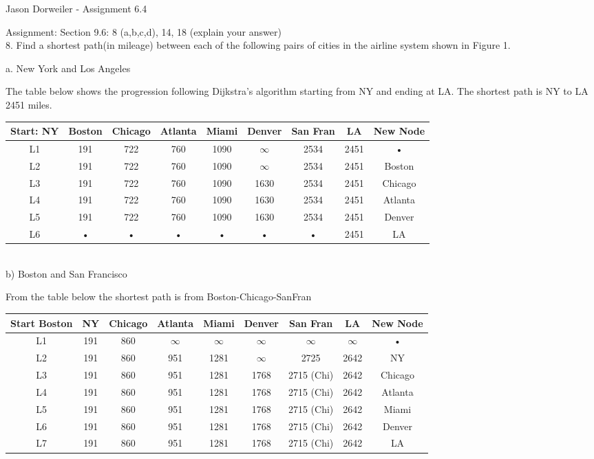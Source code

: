\documentclass{article}
\begin{document}
Jason Dorweiler - Assignment 6.4

Assignment: Section 9.6: 8 (a,b,c,d), 14, 18 (explain your answer)\\


8. Find a shortest path(in mileage) between each of the following pairs of cities in the airline
system shown in Figure 1.

a. New York and Los Angeles

The table below shows the progression following  Dijkstra's  algorithm starting from NY and ending at LA.  The shortest path is NY to LA 2451 miles. 

\begin{tabular}{|c|c|c|c|c|c|c|c|c|}
\hline 
Start: NY & Boston & Chicago & Atlanta & Miami & Denver & San Fran & LA & New Node \\ 
\hline 
L1 & 191 & 722 & 760 & 1090 & $\infty$ & 2534 & 2451 & • \\ 
\hline 
L2 & 191 & 722 & 760 & 1090 & $\infty$ & 2534 & 2451 & Boston \\ 
\hline 
L3 & 191 & 722 & 760 & 1090 & 1630 & 2534 & 2451 & Chicago \\ 
\hline 
L4 & 191 & 722 & 760 & 1090 & 1630 & 2534 & 2451 & Atlanta \\ 
\hline 
L5 & 191 & 722 & 760 & 1090 & 1630 & 2534 & 2451 & Denver \\ 
\hline 
L6 & • & • & • & • & • & • & 2451 & LA \\ 
\hline 
\end{tabular} \\


b) Boston and San Francisco

From the table below the shortest path is from Boston-Chicago-SanFran

\begin{tabular}{|c|c|c|c|c|c|c|c|c|}
\hline 
Start Boston & NY & Chicago & Atlanta & Miami & Denver & San Fran & LA & New Node \\ 
\hline 
L1 & 191 & 860 & $\infty$ & $\infty$ & $\infty$ & $\infty$ & $\infty$ & • \\ 
\hline 
L2 & 191 & 860 & 951 & 1281 & $\infty$ & 2725 & 2642 & NY \\ 
\hline 
L3 & 191 & 860 & 951 & 1281 & 1768 & 2715 (Chi) & 2642 & Chicago \\ 
\hline 
L4 & 191 & 860 & 951 & 1281 & 1768 & 2715 (Chi) & 2642 & Atlanta \\ 
\hline 
L5 & 191 & 860 & 951 & 1281 & 1768 & 2715 (Chi) & 2642 & Miami \\ 
\hline 
L6 & 191 & 860 & 951 & 1281 & 1768 & 2715 (Chi) & 2642 & Denver \\ 
\hline 
L7  & 191 & 860 & 951 & 1281 & 1768 & 2715 (Chi) & 2642 & LA \\ 
\hline 
\end{tabular} \\
\end{document}
